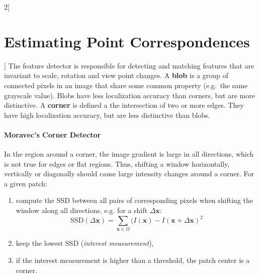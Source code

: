 \documentclass[oneside,fontsize=11pt,paper=a4]{scrartcl}
\begin{document}
\begin{multicols}{2}[\section{Estimating Point Correspondences}]
The feature detector is responsible for detecting and matching features that are invariant to scale, rotation and view point changes. A \textbf{blob} is a group of connected pixels in an image that share some common property (e.g.\ the same grayscale value). Blobs have less localization accuracy than corners, but are more distinctive. A \textbf{corner} is defined a the intersection of two or more edges. They have high localization accuracy, but are less distinctive than blobs.

\paragraph{Moravec's Corner Detector} In the region around a corner, the image gradient is large in all directions, which is not true for edges or flat regions. Thus, shifting a window horizontally, vertically or diagonally should cause large intensity changes around a corner. For a given patch:
\begin{enumerate}
    \item compute the SSD between all pairs of corresponding pixels when shifting the window along all directions, e.g. for a shift $\Delta \mathbf{x}$:
    {\small
    $$\text{SSD}(\Delta\mathbf{x})=\sum_{\mathbf{x}\in\Omega}(I(\mathbf{x})-I(\mathbf{x}+\Delta \mathbf{x})^2$$
    }
    \item keep the lowest SSD (\textit{interest measurement}),
    \item if the interest measurement is higher than a threshold, the patch center is a corner.
\end{enumerate}


\end{multicols}
\end{document}
